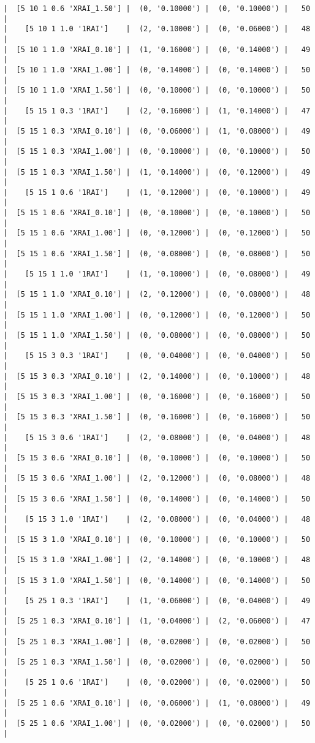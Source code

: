\documentclass{article}
\begin{document}
\begin{verbatim}
|  [5 10 1 0.6 'XRAI_1.50'] |  (0, '0.10000') |  (0, '0.10000') |   50  |
|    [5 10 1 1.0 '1RAI']    |  (2, '0.10000') |  (0, '0.06000') |   48  |
|  [5 10 1 1.0 'XRAI_0.10'] |  (1, '0.16000') |  (0, '0.14000') |   49  |
|  [5 10 1 1.0 'XRAI_1.00'] |  (0, '0.14000') |  (0, '0.14000') |   50  |
|  [5 10 1 1.0 'XRAI_1.50'] |  (0, '0.10000') |  (0, '0.10000') |   50  |
|    [5 15 1 0.3 '1RAI']    |  (2, '0.16000') |  (1, '0.14000') |   47  |
|  [5 15 1 0.3 'XRAI_0.10'] |  (0, '0.06000') |  (1, '0.08000') |   49  |
|  [5 15 1 0.3 'XRAI_1.00'] |  (0, '0.10000') |  (0, '0.10000') |   50  |
|  [5 15 1 0.3 'XRAI_1.50'] |  (1, '0.14000') |  (0, '0.12000') |   49  |
|    [5 15 1 0.6 '1RAI']    |  (1, '0.12000') |  (0, '0.10000') |   49  |
|  [5 15 1 0.6 'XRAI_0.10'] |  (0, '0.10000') |  (0, '0.10000') |   50  |
|  [5 15 1 0.6 'XRAI_1.00'] |  (0, '0.12000') |  (0, '0.12000') |   50  |
|  [5 15 1 0.6 'XRAI_1.50'] |  (0, '0.08000') |  (0, '0.08000') |   50  |
|    [5 15 1 1.0 '1RAI']    |  (1, '0.10000') |  (0, '0.08000') |   49  |
|  [5 15 1 1.0 'XRAI_0.10'] |  (2, '0.12000') |  (0, '0.08000') |   48  |
|  [5 15 1 1.0 'XRAI_1.00'] |  (0, '0.12000') |  (0, '0.12000') |   50  |
|  [5 15 1 1.0 'XRAI_1.50'] |  (0, '0.08000') |  (0, '0.08000') |   50  |
|    [5 15 3 0.3 '1RAI']    |  (0, '0.04000') |  (0, '0.04000') |   50  |
|  [5 15 3 0.3 'XRAI_0.10'] |  (2, '0.14000') |  (0, '0.10000') |   48  |
|  [5 15 3 0.3 'XRAI_1.00'] |  (0, '0.16000') |  (0, '0.16000') |   50  |
|  [5 15 3 0.3 'XRAI_1.50'] |  (0, '0.16000') |  (0, '0.16000') |   50  |
|    [5 15 3 0.6 '1RAI']    |  (2, '0.08000') |  (0, '0.04000') |   48  |
|  [5 15 3 0.6 'XRAI_0.10'] |  (0, '0.10000') |  (0, '0.10000') |   50  |
|  [5 15 3 0.6 'XRAI_1.00'] |  (2, '0.12000') |  (0, '0.08000') |   48  |
|  [5 15 3 0.6 'XRAI_1.50'] |  (0, '0.14000') |  (0, '0.14000') |   50  |
|    [5 15 3 1.0 '1RAI']    |  (2, '0.08000') |  (0, '0.04000') |   48  |
|  [5 15 3 1.0 'XRAI_0.10'] |  (0, '0.10000') |  (0, '0.10000') |   50  |
|  [5 15 3 1.0 'XRAI_1.00'] |  (2, '0.14000') |  (0, '0.10000') |   48  |
|  [5 15 3 1.0 'XRAI_1.50'] |  (0, '0.14000') |  (0, '0.14000') |   50  |
|    [5 25 1 0.3 '1RAI']    |  (1, '0.06000') |  (0, '0.04000') |   49  |
|  [5 25 1 0.3 'XRAI_0.10'] |  (1, '0.04000') |  (2, '0.06000') |   47  |
|  [5 25 1 0.3 'XRAI_1.00'] |  (0, '0.02000') |  (0, '0.02000') |   50  |
|  [5 25 1 0.3 'XRAI_1.50'] |  (0, '0.02000') |  (0, '0.02000') |   50  |
|    [5 25 1 0.6 '1RAI']    |  (0, '0.02000') |  (0, '0.02000') |   50  |
|  [5 25 1 0.6 'XRAI_0.10'] |  (0, '0.06000') |  (1, '0.08000') |   49  |
|  [5 25 1 0.6 'XRAI_1.00'] |  (0, '0.02000') |  (0, '0.02000') |   50  |

\end{verbatim}
\end{document}
